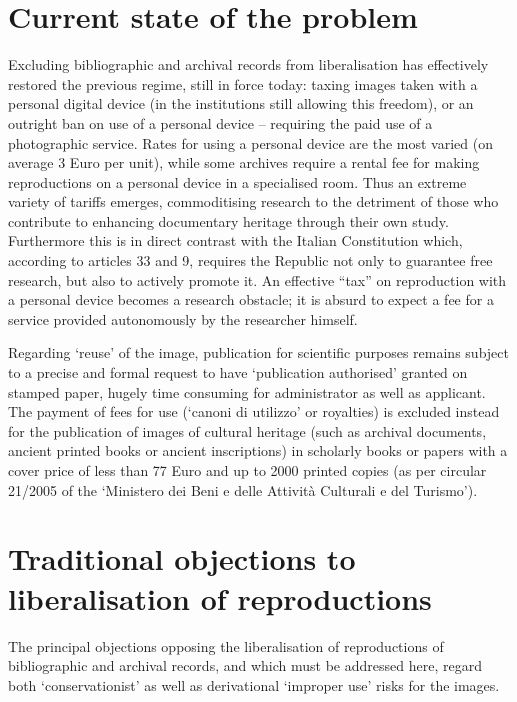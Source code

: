 \documentclass[amsthm,ebook]{saparticle}
\begin{document}
\section{Current state of the problem}

Excluding bibliographic and archival records from liberalisation has effectively restored the previous regime, still in
force today: taxing images taken with a personal digital device (in the institutions still allowing this freedom), or
an outright ban on use of a personal device – requiring the paid use of a photographic service. Rates for using a
personal device are the most varied (on average 3 Euro per unit), while some archives require a rental fee for making
reproductions on a personal device in a specialised room. Thus an extreme variety of tariffs emerges, commoditising
research to the detriment of those who contribute to enhancing documentary heritage through their own study.
Furthermore this is in direct contrast with the Italian Constitution which, according to articles 33 and 9, requires
the Republic not only to guarantee free research, but also to actively promote it. An effective ``tax'' on reproduction
with a personal device becomes a research obstacle; it is absurd to expect a fee for a service provided autonomously by
the researcher himself. 

Regarding `reuse' of the image, publication for scientific purposes remains subject to a precise and formal request to
have `publication authorised' granted on stamped paper, hugely time consuming for administrator as well as applicant.
The payment of fees for use (`canoni di utilizzo' or royalties) is excluded instead for the publication of images of
cultural heritage (such as archival documents, ancient printed books or ancient inscriptions) in scholarly books or
papers with a cover price of less than 77 Euro and up to 2000 printed copies (as per circular 21/2005 of the `Ministero
dei Beni e delle Attività Culturali e del Turismo').




\section{Traditional objections to liberalisation of reproductions}



The principal objections opposing the liberalisation of reproductions of bibliographic and archival records, and which
must be addressed here, regard both `conservationist' as well as derivational `improper use' risks for the images.
\end{document}
